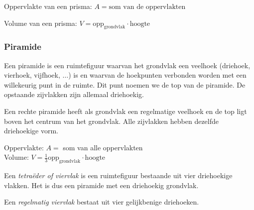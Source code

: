 


\begin{ftonthoud}
			
		Oppervlakte van een prisma: $A=\text{som van de oppervlakten}$
		
		Volume van een prisma: $V=\text{opp}_{\text{grondvlak}}\cdot \text{hoogte}$

\end{ftonthoud}		

\subsubsection{Piramide}
\begin{definitie}
	Een piramide is een ruimtefiguur waarvan het grondvlak een veelhoek (driehoek, vierhoek, vijfhoek, $\ldots$) is en waarvan de hoekpunten verbonden worden met een willekeurig punt in de ruimte. Dit punt noemen we de top van de piramide. De opstaande zijvlakken zijn allemaal driehoekig. 

\end{definitie}
Een rechte piramide heeft als grondvlak een regelmatige veelhoek en de top ligt boven het centrum van het grondvlak. Alle zijvlakken hebben dezelfde driehoekige vorm.

%



\begin{ftonthoud}
	Oppervlakte: $A=$ som van alle oppervlakten
\\
Volume: $V=\frac{1}{3}\text{opp}_{\text{grondvlak}}\cdot \text{hoogte}$
\end{ftonthoud}

\begin{definitie}
	Een \emph{tetra\"eder of viervlak} is een ruimtefiguur bestaande uit vier driehoekige vlakken. Het is dus een piramide met een driehoekig grondvlak.

Een \emph{regelmatig viervlak} bestaat uit vier gelijkbenige driehoeken.

\end{definitie}

